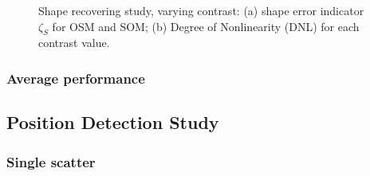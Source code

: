\documentclass{IEEEtran}
\begin{document}
                \begin{figure}
                    \centering
                    \caption{Shape recovering study, varying contrast: (a) shape error indicator $\zeta_S$ for OSM and SOM; (b) Degree of Nonlinearity (DNL) for each contrast value.}
                    \label{fig:shape:vary:indicators}
                \end{figure}

			\subsubsection{Average performance}\label{sec:results:shape:average}
		
		\subsection{Position Detection Study}\label{sec:results:position}
		
			\subsubsection{Single scatter}\label{sec:results:position:single}
			
\end{document}
